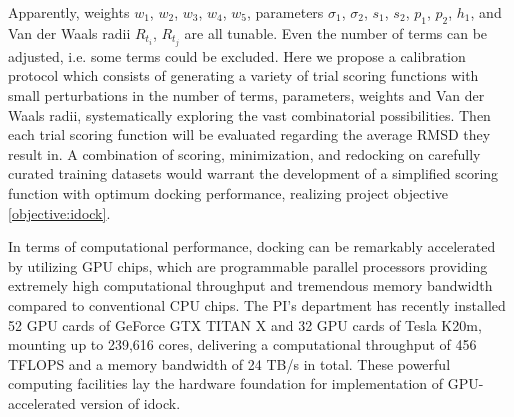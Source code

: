 \documentclass[a4paper,12pt]{article}
\begin{document}
Apparently, weights $w_1$, $w_2$, $w_3$, $w_4$, $w_5$, parameters $\sigma_1$, $\sigma_2$, $s_1$, $s_2$, $p_1$, $p_2$, $h_1$, and Van der Waals radii $R_{t_i}$, $R_{t_j}$ are all tunable. Even the number of terms can be adjusted, i.e. some terms could be excluded. Here we propose a calibration protocol which consists of generating a variety of trial scoring functions with small perturbations in the number of terms, parameters, weights and Van der Waals radii, systematically exploring the vast combinatorial possibilities. Then each trial scoring function will be evaluated regarding the average RMSD they result in. A combination of scoring, minimization, and redocking on carefully curated training datasets would warrant the development of a simplified scoring function with optimum docking performance, realizing project objective \ref{objective:idock}.

In terms of computational performance, docking can be remarkably accelerated by utilizing GPU chips, which are programmable parallel processors providing extremely high computational throughput and tremendous memory bandwidth compared to conventional CPU chips. The PI's department has recently installed 52 GPU cards of GeForce GTX TITAN X and 32 GPU cards of Tesla K20m, mounting up to 239,616 cores, delivering a computational throughput of 456 TFLOPS and a memory bandwidth of 24 TB/s in total. These powerful computing facilities lay the hardware foundation for implementation of GPU-accelerated version of idock.


\end{document}
